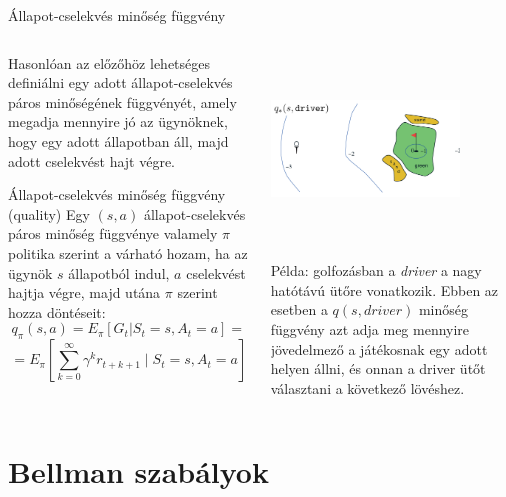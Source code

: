 \documentclass[english, aspectratio=169]{beamer}
\makeatletter
\let\origtableofcontents=\tableofcontents
\def\tableofcontents{\@ifnextchar[{\origtableofcontents}{\gobbletableofcontents}}
\def\gobbletableofcontents#1{\origtableofcontents}
\makeatother
\begin{document}
\begin{frame}{Állapot-cselekvés minőség függvény}
\begin{columns}
\begin{column}{.62\textwidth}
Hasonlóan az előzőhöz lehetséges definiálni egy adott állapot-cselekvés páros minőségének függvényét, amely megadja mennyire jó az ügynöknek, hogy egy adott állapotban áll, majd adott cselekvést hajt végre.
\begin{block}{Állapot-cselekvés minőség függvény (quality)}
Egy $(s,a)$ állapot-cselekvés páros minőség függvénye valamely $\pi$ politika szerint a várható hozam, ha az ügynök $s$ állapotból indul, $a$ cselekvést hajtja végre, majd utána $\pi$ szerint hozza döntéseit:\\
\[
q_{\pi}(s,a)=E_{\pi}\left[G_{t}|S_{t}=s,A_{t}=a\right]=
\]
\[
=E_{\pi}\left[\sum_{k=0}^{\infty}\gamma^{k}r_{t+k+1}\mid S_{t}=s,A_{t}=a\right]
\]
\end{block}
\end{column}
\begin{column}{.4\textwidth}
\begin{center}
\includegraphics[width=5cm, height=5cm, keepaspectratio]{images/reinf_10.png}
\end{center}
\begin{small}
Példa: golfozásban a \emph{driver} a nagy  hatótávú ütőre vonatkozik. Ebben az esetben a $q(s, driver)$ minőség függvény azt adja meg mennyire jövedelmező a játékosnak egy adott helyen állni, és onnan a driver ütőt választani a következő lövéshez.
\end{small}
\end{column}
\end{columns}
\end{frame}

\section{Bellman szabályok}

\begin{frame}
\tableofcontents[currentsection]
\end{frame}
\end{document}
